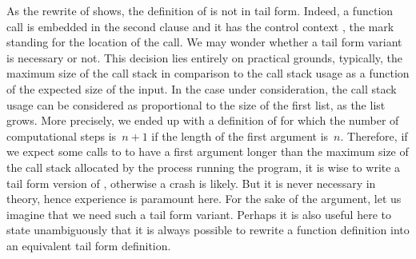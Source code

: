 As the rewrite of  shows, the definition of
 is not in tail form. Indeed, a function call is
embedded in the second clause and it has the control context
\erlcode{[I|\textvisiblespace]}, the mark \erlcode{\textvisiblespace}
standing for the location of the call. We may wonder whether a tail
form variant is necessary or not. This decision lies entirely on
practical grounds, typically, the maximum size of the call stack in
comparison to the call stack usage as a function of the expected size
of the input. In the case under consideration, the call stack usage
can be considered as proportional to the size of the first list, as
the list grows. More precisely, we ended up with a definition of
 for which the number of computational steps
is~\(n+1\) if the length of the first argument is~\(n\). Therefore, if
we expect some calls to  to have a first argument
longer than the maximum size of the call stack allocated by the
process running the program, it is wise to write a tail form version
of , otherwise a crash is likely. But it is never
necessary in theory, hence experience is paramount here. For the sake
of the argument, let us imagine that we need such a tail form
variant. Perhaps it is also useful here to state unambiguously that it
is always possible to rewrite a function definition into an equivalent
tail form definition.

